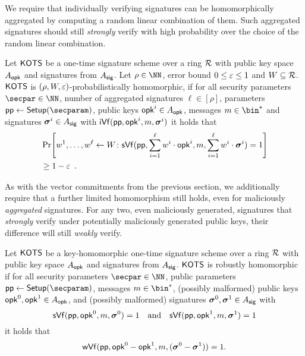 We require that individually verifying signatures can be homomorphically aggregated by computing a random linear combination of them.
Such aggregated signatures should still \emph{strongly} verify with high probability over the choice of the random linear combination.

\begin{definition}
  Let $\mathsf{KOTS}$ be a one-time signature scheme over a ring $\mathcal{R}$ with public key space $A_{\mathsf{opk}}$ and signatures from $A_{\mathsf{sig}}$.
  Let $\rho \in \NN$, error bound $0\leq \varepsilon \leq 1$ and $W\subseteq \mathcal{R}$.
  $\mathsf{KOTS}$ is $(\rho,W,\varepsilon)$-probabilistically homomorphic, if 
  for all security parameters $\secpar\in\NN$, number of aggregated signatures $\ell\in[\rho]$, parameters $\params \gets \setup(\secparam)$, public keys $\mathsf{opk}^i \in A_{\mathsf{opk}}$, messages $m\in\bin^*$ and signatures $\boldsymbol{\sigma}^i\in A_{\mathsf{sig}}$ with $\mathsf{iVf}(\mathsf{pp},\mathsf{opk}^i,m,\boldsymbol{\sigma}^i)$ it holds that
  \begin{align*}
    &\Pr\mleft[
      w^1,\dots,w^\ell\gets W
      \colon
      \sverify(\params,\sum_{i=1}^{\ell}w^i\cdot\opk^i,m,\sum_{i=1}^{\ell}w^i\cdot\vec{\sigma}^i) = 1
    \mright] \\
    &\geq 1-\errorbound\enspace.
  \end{align*}
\end{definition}

As with the vector commitments from the previous section, we additionally require that a further limited homomorphism still holds, even for maliciously \emph{aggregated} signatures.
For any two, even maliciously generated, signatures that \emph{strongly} verify under potentially maliciously generated public keys, their difference will still \emph{weakly} verify.

\begin{definition}
  \label{def:malhomhots}
  Let $\mathsf{KOTS}$ be a key-homomorphic one-time signature scheme over a ring $\mathcal{R}$ with public key space $A_{\mathsf{opk}}$ and signatures from $A_{\mathsf{sig}}$.
  $\mathsf{KOTS}$ is robustly homomorphic if for all security parameters $\secpar\in\NN$, public parameters $\params\gets\setup(\secparam)$, messages $m\in\bin^*$, (possibly malformed) public keys $\mathsf{opk}^0,\mathsf{opk}^1 \in A_{\mathsf{opk}}$, and (possibly malformed) signatures $\boldsymbol{\sigma}^0,\boldsymbol{\sigma}^1\in A_{\mathsf{sig}}$ with
  \[
    \mathsf{sVf}(\mathsf{pp},\mathsf{opk}^0, m,\boldsymbol{\sigma}^0)=1 \quad \text{and} \quad \mathsf{sVf}(\mathsf{pp},\mathsf{opk}^1, m,\boldsymbol{\sigma}^1)=1
  \]
  it holds that
  \[
    \mathsf{wVf}(\mathsf{pp},\mathsf{opk}^0-\mathsf{opk}^1, m,(\boldsymbol{\sigma}^0-\boldsymbol{\sigma}^1))=1.
  \]
\end{definition}

